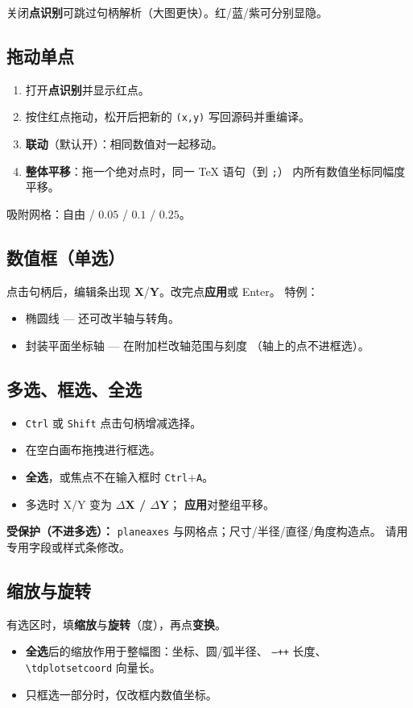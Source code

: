 \documentclass[a4paper]{ltxdoc}
\newcommand{\ui}[1]{\textbf{#1}}
\newcommand{\key}[1]{\texttt{#1}}
\begin{document}
关闭\ui{点识别}可跳过句柄解析（大图更快）。红/蓝/紫可分别显隐。

\subsection{拖动单点}
\begin{enumerate}[nosep]
  \item 打开\ui{点识别}并显示红点。
  \item 按住红点拖动，松开后把新的 \texttt{(x,y)} 写回源码并重编译。
  \item \ui{联动}（默认开）：相同数值对一起移动。
  \item \ui{整体平移}：拖一个绝对点时，同一 TeX 语句（到 \texttt{;}）
        内所有数值坐标同幅度平移。
\end{enumerate}
吸附网格：自由 / $0.05$ / $0.1$ / $0.25$。

\subsection{数值框（单选）}
点击句柄后，编辑条出现 \ui{X}/\ui{Y}。改完点\ui{应用}或 Enter。
特例：
\begin{itemize}[nosep]
  \item 椭圆线 --- 还可改半轴与转角。
  \item 封装平面坐标轴 --- 在附加栏改轴范围与刻度
        （轴上的点不进框选）。
\end{itemize}

\subsection{多选、框选、全选}
\begin{itemize}[nosep]
  \item \key{Ctrl} 或 \key{Shift} 点击句柄增减选择。
  \item 在空白画布拖拽进行框选。
  \item \ui{全选}，或焦点不在输入框时 \key{Ctrl}+\key{A}。
  \item 多选时 X/Y 变为 \textbf{$\Delta$X / $\Delta$Y}；
        \ui{应用}对整组平移。
\end{itemize}

\noindent\textbf{受保护（不进多选）：}
\texttt{planeaxes} 与网格点；尺寸/半径/直径/角度构造点。
请用专用字段或样式条修改。

\subsection{缩放与旋转}
有选区时，填\ui{缩放}与\ui{旋转}（度），再点\ui{变换}。
\begin{itemize}[nosep]
  \item \ui{全选}后的缩放作用于整幅图：坐标、圆/弧半径、
        \texttt{--++} 长度、\texttt{\textbackslash tdplotsetcoord} 向量长。
  \item 只框选一部分时，仅改框内数值坐标。
\end{itemize}
\end{document}
